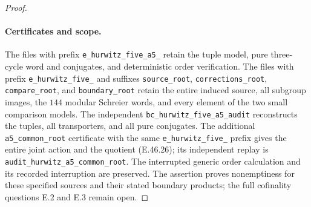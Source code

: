 \begin{proof}
\paragraph{Certificates and scope.}
The files with prefix \texttt{e\_hurwitz\_five\_a5\_}
retain the tuple model, pure three-cycle word and
conjugates, and deterministic order verification.
The files with prefix \texttt{e\_hurwitz\_five\_}
and suffixes \texttt{source\_root},
\texttt{corrections\_root}, \texttt{compare\_root},
and \texttt{boundary\_root} retain the entire induced
source, all subgroup images, the $144$ modular
Schreier words, and every element of the two small
comparison models.  The independent
\texttt{bc\_hurwitz\_five\_a5\_audit} reconstructs
the tuples, all transporters, and all pure conjugates.
The additional \texttt{a5\_common\_root} certificate
with the same \texttt{e\_hurwitz\_five\_} prefix
gives the entire joint action and the quotient
\textup{(E.46.26)}; its independent replay is
\texttt{audit\_hurwitz\_a5\_common\_root}.
The interrupted generic order calculation and its
recorded interruption are preserved.
The assertion proves nonemptiness for these specified
sources and their stated boundary products; the
full cofinality questions E.2 and E.3 remain open.
\end{proof}
